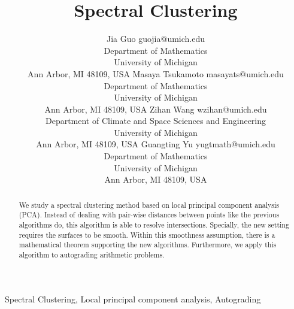 \documentclass[twoside,11pt]{article}
\begin{document}
\title{Spectral Clustering}

\author{\name Jia Guo \email guojia@umich.edu \\
        \addr Department of Mathematics\\
        University of Michigan\\
        Ann Arbor, MI 48109, USA
        \AND
        \name Masaya Tsukamoto \email masayats@umich.edu \\
        \addr Department of Mathematics\\
        University of Michigan\\
        Ann Arbor, MI 48109, USA
        \AND
        \name Zihan Wang \email wzihan@umich.edu \\
        \addr Department of Climate and Space Sciences and Engineering\\
        University of Michigan\\
        Ann Arbor, MI 48109, USA
        \AND
        \name Guangting Yu \email yugtmath@umich.edu \\
        \addr Department of Mathematics\\
        University of Michigan\\
        Ann Arbor, MI 48109, USA}


\maketitle

\begin{abstract}
We study a spectral clustering method based on local principal component analysis (PCA).
Instead of dealing with pair-wise distances between points like the previous algorithms do, this algorithm is able to resolve intersections.
Specially, the new setting requires the surfaces to be smooth.
Within this smoothness assumption, there is a mathematical theorem supporting the new algorithms.
Furthermore, we apply this algorithm to autograding arithmetic problems.
\end{abstract}

\begin{keywords}
Spectral Clustering, Local principal component analysis, Autograding
\end{keywords}


\end{document}
